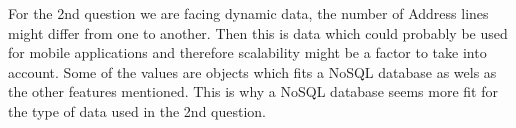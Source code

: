 \documentclass[8pt]{article}
\begin{document}
For the 2nd question we are facing dynamic data, the number of Address lines might differ from one to another. Then this is data which could probably be used for mobile applications and therefore scalability might be a factor to take into account. Some of the values are objects which fits a NoSQL database as wels as the other features mentioned. This is why a NoSQL database seems more fit for the type of data used in the 2nd question.
     

\end{document}
